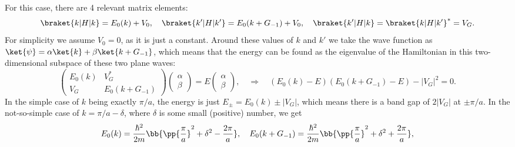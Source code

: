 \documentclass[main.tex]{subfiles}
\begin{document}
	For this case, there are 4 relevant matrix elements:
	\begin{align}
		\braket{k|H|k} = E_0(k) + V_0, \quad \braket{k'|H|k'} = E_0(k+G_{-1}) + V_0, \quad \braket{k'|H|k} = \braket{k|H|k'}^* = V_G.
	\end{align}
	For simplicity we assume $ V_0 = 0 $, as it is just a constant. Around these values of $ k $ and $ k' $ we take the wave function as $ \ket{\psi} = \alpha \ket{k} + \beta \ket{k+G_{-1}} $, which means that the energy can be found as the eigenvalue of the Hamiltonian in this two-dimensional subspace of these two plane waves:
	\begin{equation}
		\begin{pmatrix}
			E_0(k) & V_G^* \\ V_G & E_0(k+G_{-1})
		\end{pmatrix} \begin{pmatrix}
		\alpha \\ \beta
		\end{pmatrix} = E \begin{pmatrix}
		\alpha \\ \beta
		\end{pmatrix}, \quad \Rightarrow \quad (E_0(k)-E)(E_0(k+G_{-1})-E) - |V_G|^2 = 0.
	\end{equation}
	In the simple case of $ k $ being exactly $ \pi/a $, the energy is just $ E_{\pm} = E_0(k) \pm | V_G| $, which means there is a band gap of $ 2|V_G| $ at $ \pm \pi/a $. In the not-so-simple case of $ k = \pi/a - \delta $, where $ \delta $ is some small (positive) number, we get
	\begin{equation}
		E_0(k) = \frac{\hbar^2}{2m}\bb{\pp{\frac{\pi}{a}}^2 + \delta^2 - \frac{2\pi}{a}}, \quad E_0(k+G_{-1}) = \frac{\hbar^2}{2m} \bb{\pp{\frac{\pi}{a}}^2 + \delta^2 + \frac{2\pi}{a}},
	\end{equation}
\end{document}
